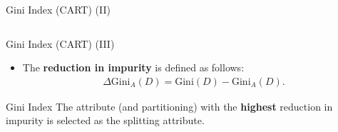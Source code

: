 \begin{frame}{Gini Index (CART) (II)}
{\begin{columns}
{\begin{column}{0.45\textwidth}
				\end{column}
			}
		\end{columns}

		\vspace*{0.25cm}

	}
\end{frame}

\begin{frame}{Gini Index (CART) (III)}
	\begin{itemize}
		\item The \textbf{reduction in impurity} is defined as
		      follows:
		      \begin{align*}
			      \Delta\text{Gini}_A(D) = \text{Gini}(D)-\text{Gini}_A(D).
		      \end{align*}
	\end{itemize}

	\vspace*{4em}

	\begin{block}{Gini Index}
		The attribute (and partitioning) with the \textbf{highest} reduction in impurity is selected as the splitting attribute.
	\end{block}

\end{frame}

